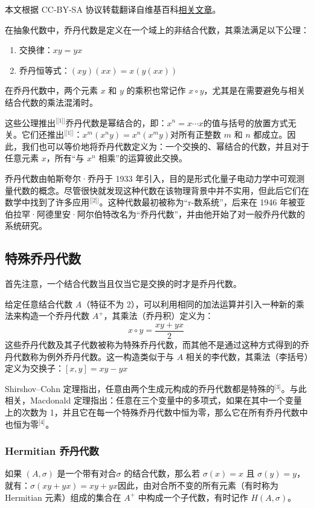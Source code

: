 
本文根据 CC-BY-SA 协议转载翻译自维基百科\href{https://en.wikipedia.org/wiki/Jordan_algebra}{相关文章}。

在抽象代数中，乔丹代数是定义在一个域上的非结合代数，其乘法满足以下公理：
\begin{enumerate}
\item 交换律：$xy = yx$
\item 乔丹恒等式：$(xy)(xx) = x(y(xx))$
\end{enumerate}
在乔丹代数中，两个元素 $x$ 和 $y$ 的乘积也常记作 $x \circ y$，尤其是在需要避免与相关结合代数的乘法混淆时。

这些公理推出\(^\text{[[1]]}\)乔丹代数是幂结合的，即：$x^n = x \cdots x$的值与括号的放置方式无关。它们还推出\(^\text{[[1]]}\)：$x^{m}(x^{n}y) = x^{n}(x^{m}y)$对所有正整数 $m$ 和 $n$ 都成立。因此，我们也可以等价地将乔丹代数定义为：一个交换的、幂结合的代数，并且对于任意元素 $x$，所有“与 $x^n$ 相乘”的运算彼此交换。

乔丹代数由帕斯夸尔·乔丹于 1933 年引入，目的是形式化量子电动力学中可观测量代数的概念。尽管很快就发现这种代数在该物理背景中并不实用，但此后它们在数学中找到了许多应用\(^\text{[[2]]}\)。这种代数最初被称为“r-数系统”，后来在 1946 年被亚伯拉罕·阿德里安·阿尔伯特改名为“乔丹代数”，并由他开始了对一般乔丹代数的系统研究。
\subsection{特殊乔丹代数}
首先注意，一个结合代数当且仅当它是交换的时才是乔丹代数。

给定任意结合代数 $A$（特征不为 2），可以利用相同的加法运算并引入一种新的乘法来构造一个乔丹代数 $A^+$，其乘法（乔丹积）定义为：
$$
x \circ y = \frac{xy + yx}{2}~
$$
这些乔丹代数及其子代数被称为特殊乔丹代数，而其他不是通过这种方式得到的乔丹代数称为例外乔丹代数。这一构造类似于与 $A$ 相关的李代数，其乘法（李括号）定义为交换子：$[x, y] = xy - yx$

Shirshov–Cohn 定理指出，任意由两个生成元构成的乔丹代数都是特殊的\(^\text{[3]}\)。与此相关，Macdonald 定理指出：任意在三个变量中的多项式，如果在其中一个变量上的次数为 1，并且它在每一个特殊乔丹代数中恒为零，那么它在所有乔丹代数中也恒为零\(^\text{[4]}\)。
\subsubsection{Hermitian 乔丹代数}
如果 $(A, \sigma)$ 是一个带有对合$\sigma$ 的结合代数，那么若 $\sigma(x) = x$ 且 $\sigma(y) = y$，就有：$\sigma(xy + yx) = xy + yx$因此，由对合所不变的所有元素（有时称为Hermitian 元素）组成的集合在 $A^+$ 中构成一个子代数，有时记作 $H(A, \sigma)$。
